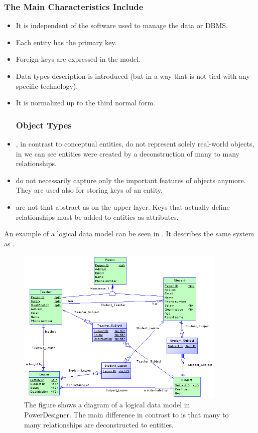 \subsubsection{The Main Characteristics Include}
\begin{itemize}
	\item It is independent of the software used to manage the data or DBMS.
	\item Each entity has the primary key.
	\item Foreign keys are expressed in the model.
	\item Data types description is introduced (but in a way that is not tied with any specific technology).
	\item It is normalized up to the third normal form.
	\subsubsection{Object Types}
	\item {}, in contrast to conceptual entities, do not represent solely real-world objects, in  we can see entities were created by a deconstruction of many to many relationships.
	\item {} do not necessarily capture only the important features of objects anymore. They are used also for storing keys of an entity.
	\item {} are not that abstract as on the upper layer. Keys that actually define relationships must be added to entities as attributes.
\end{itemize}

An example of a logical data model can be seen in . It describes the same system as .

\begin{figure}[H]
	\centering
	\includegraphics[width=10cm]{../img/Logical_Model_PowerDesigner}
	\caption[Logical diagram\cite{PowerDesignerDocumentation}s]{ The figure shows a diagram of a logical data model in PowerDesigner. The main difference in contrast to  is that many to many relationships are deconstructed to entities.}
	\label{LDM}
\end{figure}

